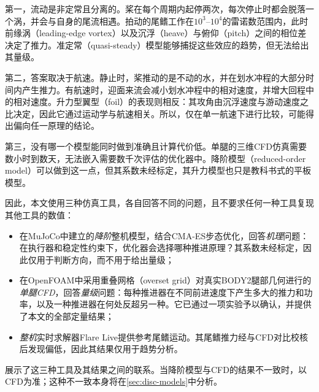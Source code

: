 第一，流动是非定常且分离的。桨在每个周期内起停两次，每次停止时都会脱落一个涡，并会与自身的尾流相遇。拍动的尾鳍工作在$10^3$--$10^4$的雷诺数范围内，此时前缘涡（leading-edge vortex）以及沉浮（heave）与俯仰（pitch）之间的相位差决定了推力\cite{Triantafyllou1991,Anderson1998}。准定常（quasi-steady）模型能够捕捉这些效应的趋势，但无法给出其量级\cite{Kim2011}。

第二，答案取决于航速。静止时，桨推动的是不动的水，并在划水冲程的大部分时间内产生推力。有航速时，迎面来流会减小划水冲程中的相对速度，并增大回程中的相对速度。升力型翼型（foil）的表现则相反：其攻角由沉浮速度与游动速度之比决定，因此它通过运动学与航速相关。所以，仅在单一航速下进行比较，可能得出偏向任一原理的结论。

第三，没有哪一个模型能同时做到准确且计算代价低。单腿的三维CFD仿真需要数小时到数天，无法嵌入需要数千次评估的优化器中。降阶模型（reduced-order model）可以做到这一点，但其系数未经标定，其升力模型也只是教科书式的平板模型。

因此，本文使用三种仿真工具，各自回答不同的问题，且不要求任何一种工具复现其他工具的数值：
\begin{itemize}
  \item 在MuJoCo中建立的\emph{降阶}整机模型，结合CMA-ES步态优化，回答\emph{机理}问题：在执行器和稳定性约束下，优化器会选择哪种推进原理？其系数未经标定，因此仅用于判断方向，而不用于给出量级；
  \item 在OpenFOAM中采用重叠网格（overset grid）对真实BODY2腿部几何进行的\emph{单腿CFD}，回答\emph{量级}问题：每种推进器在不同前进速度下产生多大的推力和功率，以及一种推进器在何处反超另一种。它已通过一项实验予以确认，并提供了本文的全部定量结果；
  \item \emph{整机}实时求解器Flare Live提供参考尾鳍运动。其尾鳍推力经与CFD对比校核后发现偏低，因此其结果仅用于趋势分析。
\end{itemize}
展示了这三种工具及其结果之间的联系。当降阶模型与CFD的结果不一致时，以CFD为准；这种不一致本身将在\cref{sec:disc-models}中分析。


